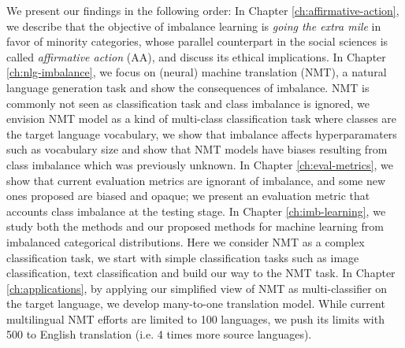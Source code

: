 We present our findings in the following order:
In Chapter \ref{ch:affirmative-action}, we describe that the objective of imbalance learning is \textit{going the extra mile} in favor of minority categories, whose parallel counterpart in the social sciences is called \textit{affirmative action} (AA), and discuss its ethical implications. 
In Chapter \ref{ch:nlg-imbalance}, we focus on (neural) machine translation (NMT), a natural language generation task and show the consequences of imbalance.
NMT is commonly not seen as classification task and class imbalance is ignored, we envision NMT model as a kind of multi-class classification task where classes are the target language vocabulary, we show that imbalance affects hyperparamaters such as vocabulary size and show that NMT models have biases resulting from class imbalance which was previously unknown.
In Chapter \ref{ch:eval-metrics}, we show that current evaluation metrics are ignorant of imbalance, and some new ones proposed are biased and opaque; we present an evaluation metric that accounts class imbalance at the testing stage.
In Chapter \ref{ch:imb-learning}, we study both the methods and our proposed methods for machine learning from imbalanced categorical distributions.
Here we consider NMT as a complex classification task, we start with simple classification tasks such as image classification, text classification and build our way to the NMT task.
In Chapter \ref{ch:applications}, by applying our simplified view of NMT as multi-classifier on the target language, we develop many-to-one translation model. While current multilingual NMT efforts are limited to 100 languages, we push its limits with 500 to English translation (i.e. 4 times more source languages). 



